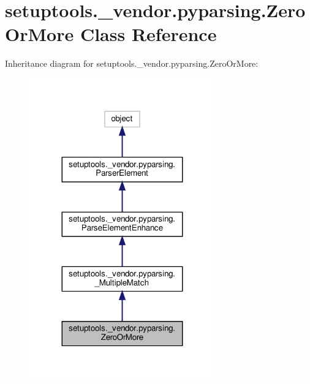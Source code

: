 \hypertarget{classsetuptools_1_1__vendor_1_1pyparsing_1_1ZeroOrMore}{}\section{setuptools.\+\_\+vendor.\+pyparsing.\+Zero\+Or\+More Class Reference}
\label{classsetuptools_1_1__vendor_1_1pyparsing_1_1ZeroOrMore}


Inheritance diagram for setuptools.\+\_\+vendor.\+pyparsing.\+Zero\+Or\+More\+:
\nopagebreak
\begin{figure}[H]
\begin{center}
\leavevmode
\includegraphics[width=227pt]{classsetuptools_1_1__vendor_1_1pyparsing_1_1ZeroOrMore__inherit__graph}
\end{center}
\end{figure}


